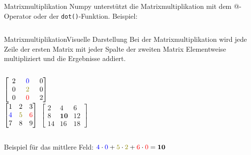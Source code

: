 \documentclass[xelatex,aspectratio=169]{beamer}
\begin{document}
\begin{frame}{Matrixmultiplikation}
    Numpy unterstützt die Matrixmultiplikation mit dem @-Operator oder der \texttt{dot()}-Funktion. Beispiel:
    \inputminted[firstline=3]{python}{src/numpy_arrays_multiply.py}
\end{frame}
\begin{frame}{Matrixmultiplikation}{Visuelle Darstellung}
    Bei der Matrixmultiplikation wird jede Zeile der ersten Matrix mit jeder Spalte der zweiten Matrix Elementweise multipliziert und die Ergebnisse addiert.
    \vspace{0.5cm}
    \begin{columns}
        \begin{column}{0.4\textwidth}
            \begin{center}
                \flushright
                $\begin{bmatrix}
                        \textcolor{white}{0}2 & \textcolor{white}{0}\textcolor{blue}{0}  & \textcolor{white}{0}0 \\
                        \textcolor{white}{0}0 & \textcolor{white}{0}\textcolor{olive}{2} & \textcolor{white}{0}0 \\
                        \textcolor{white}{0}0 & \textcolor{white}{0}\textcolor{red}{0}   & \textcolor{white}{0}2
                    \end{bmatrix}$ \\
                $\begin{bmatrix}
                        1                   & 2                    & 3                  \\
                        \textcolor{blue}{4} & \textcolor{olive}{5} & \textcolor{red}{6} \\
                        7                   & 8                    & 9
                    \end{bmatrix}$
                $\begin{bmatrix}
                        2  & 4           & 6  \\
                        8  & \textbf{10} & 12 \\
                        14 & 16          & 18
                    \end{bmatrix}$
            \end{center}
        \end{column}
    \end{columns}
    \vspace{0.5cm}
    Beispiel für das mittlere Feld: \(\textcolor{blue}{4} \cdot \textcolor{blue}{0} + \textcolor{olive}{5} \cdot \textcolor{olive}{2} + \textcolor{red}{6} \cdot \textcolor{red}{0} = \textbf{10}\)
\end{frame}
\end{document}
